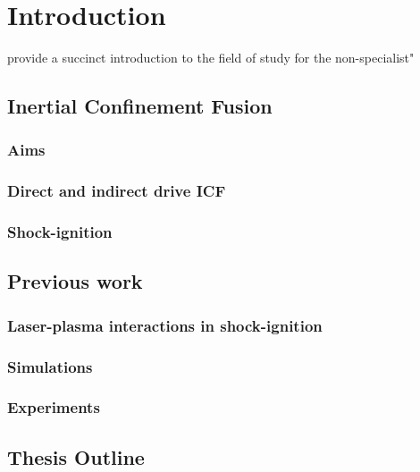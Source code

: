 \chapter{Introduction}
\label{chp:introduction}
provide a succinct introduction to the field of study for the non-specialist"

\section{Inertial Confinement Fusion}
\subsection{Aims}
\subsection{Direct and indirect drive ICF}
\subsection{Shock-ignition}

\section{Previous work}
\subsection{Laser-plasma interactions in shock-ignition}
\subsection{Simulations}
\subsection{Experiments}

\section{Thesis Outline}
